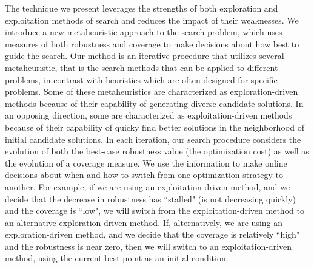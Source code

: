 The technique we present leverages the strengths of both exploration and exploitation methods of search and reduces the impact of their weaknesses.
We introduce a new metaheuristic approach to the search problem, which uses measures of both robustness and coverage to make decisions about how best to guide the search.
Our method is an iterative procedure that utilizes several metaheuristic, that is the search methods that can be applied to different problems, in contrast with heuristics which are often designed for specific problems. Some of these metaheuristics are characterized as exploration-driven methods because of their capability of generating diverse candidate solutions. In an opposing direction, some are characterized as exploitation-driven methods because of their capability of quicky find better solutions in the neighborhood of initial candidate solutions. 
In each iteration, our search procedure considers the evolution of both the best-case robustness value (the optimization cost) as well as the evolution of a coverage measure.
We use the information to make online decisions about when and how to switch from one optimization strategy to another. 
For example, if we are using an exploitation-driven method, and we decide that the decrease in robustness has ``stalled" (is not decreasing quickly) and the coverage is ``low", we will switch from the exploitation-driven method to an alternative exploration-driven method.
If, alternatively, we are using an exploration-driven method, and we decide that the coverage is relatively ``high" and the robustness is near zero, then we will switch to an exploitation-driven method, using the current best point as an initial condition.
 


